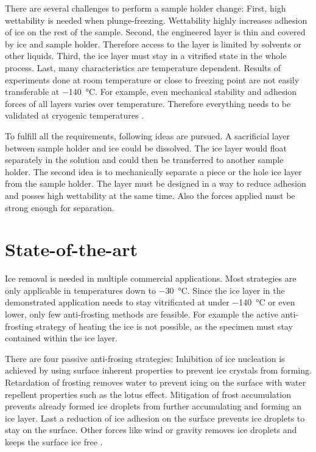 There are several challenges to perform a sample holder change: First, high wettability is needed when plunge-freezing. Wettability highly increases adhesion of ice on the rest of the sample. Second, the engineered layer is thin and covered by ice and sample holder. Therefore access to the layer is limited by solvents or other liquids. Third, the ice layer must stay in a vitrified state in the whole process. Last, many characteristics are temperature dependent. Results of experiments done at room temperature or close to freezing point are not easily transferable at \SI{-140}{\degreeCelsius}. For example, even mechanical stability and adhesion forces of all layers varies over temperature. Therefore everything needs to be validated at cryogenic temperatures \cite{Makkonen.2012}.

To fulfill all the requirements, following ideas are pursued. A sacrificial layer between sample holder and ice could be dissolved. The ice layer would float separately in the solution and could then be transferred to another sample holder. The second idea is to mechanically separate a piece or the hole ice layer from the sample holder. The layer must be designed in a way to reduce adhesion and posses high wettability at the same time. Also the forces applied must be strong enough for separation.


\section{State-of-the-art}
\label{section:Stateoftheart}

Ice removal is needed in multiple commercial applications. Most strategies are only applicable in temperatures down to \SI{-30}{\degreeCelsius}. Since the ice layer in the demonstrated application needs to stay vitrificated at under \SI{-140}{\degreeCelsius} or even lower, only few anti-frosting methods are feasible. For example the active anti-frosting strategy of heating the ice is not possible, as the specimen must stay contained within the ice layer.

There are four passive anti-frosing strategies: Inhibition of ice nucleation is achieved by using surface inherent properties to prevent ice crystals from forming. Retardation of frosting removes water to prevent icing on the surface with water repellent properties such as the lotus effect. Mitigation of frost accumulation prevents already formed ice droplets from further accumulating and forming an ice layer. Last a reduction of ice adhesion on the surface prevents ice droplets to stay on the surface. Other forces like wind or gravity removes ice droplets and keeps the surface ice free \cite{Yang.2021}. 

